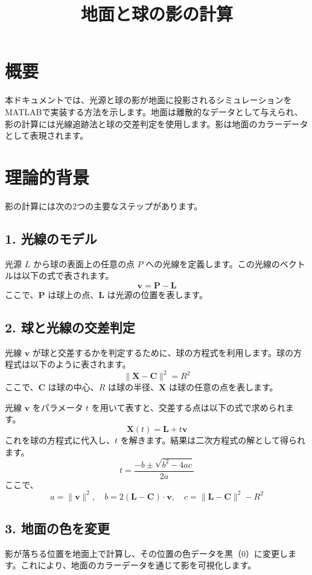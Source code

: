 \documentclass[a4paper,12pt]{article}
\title{地面と球の影の計算}
\author{}
\date{}
\begin{document}
\maketitle

\section*{概要}
本ドキュメントでは、光源と球の影が地面に投影されるシミュレーションをMATLABで実装する方法を示します。地面は離散的なデータとして与えられ、影の計算には光線追跡法と球の交差判定を使用します。影は地面のカラーデータとして表現されます。

\section*{理論的背景}
影の計算には次の2つの主要なステップがあります。

\subsection*{1. 光線のモデル}
光源 $L$ から球の表面上の任意の点 $P$ への光線を定義します。この光線のベクトルは以下の式で表されます。
\[
\mathbf{v} = \mathbf{P} - \mathbf{L}
\]
ここで、$\mathbf{P}$ は球上の点、$\mathbf{L}$ は光源の位置を表します。

\subsection*{2. 球と光線の交差判定}
光線 $\mathbf{v}$ が球と交差するかを判定するために、球の方程式を利用します。球の方程式は以下のように表されます。
\[
\|\mathbf{X} - \mathbf{C}\|^2 = R^2
\]
ここで、$\mathbf{C}$ は球の中心、$R$ は球の半径、$\mathbf{X}$ は球の任意の点を表します。

光線 $\mathbf{v}$ をパラメータ $t$ を用いて表すと、交差する点は以下の式で求められます。
\[
\mathbf{X}(t) = \mathbf{L} + t \mathbf{v}
\]
これを球の方程式に代入し、$t$ を解きます。結果は二次方程式の解として得られます。
\[
t = \frac{-b \pm \sqrt{b^2 - 4ac}}{2a}
\]
ここで、
\[
a = \|\mathbf{v}\|^2, \quad b = 2(\mathbf{L} - \mathbf{C}) \cdot \mathbf{v}, \quad c = \|\mathbf{L} - \mathbf{C}\|^2 - R^2
\]

\subsection*{3. 地面の色を変更}
影が落ちる位置を地面上で計算し、その位置の色データを黒（0）に変更します。これにより、地面のカラーデータを通じて影を可視化します。
\end{document}
